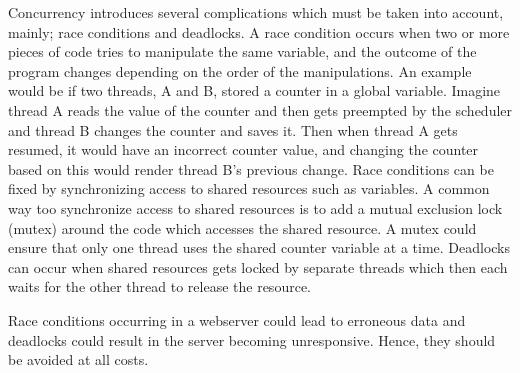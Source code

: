 Concurrency introduces several complications which must be taken into account,
mainly; race conditions and deadlocks. A race condition occurs when two or more
pieces of code tries to manipulate the same variable, and the outcome of the
program changes depending on the order of the manipulations. An example would be
if two threads, A and B, stored a counter in a global variable. Imagine thread A 
reads the value of the counter and then gets preempted by the scheduler and thread B changes
the counter and saves it. Then when thread A gets resumed, it would have an
incorrect counter value, and changing the counter based on this would render
thread B's previous change. Race conditions can be fixed by synchronizing access
to shared resources such as variables. A common way too synchronize access to
shared resources is to add a mutual exclusion lock (mutex) around the code which
accesses the shared resource. A mutex could ensure that only one thread uses the
shared counter variable at a time. Deadlocks can occur when shared resources gets
locked by separate threads which then each waits for the other thread to
release the resource.

Race conditions occurring in a webserver could lead to erroneous data and
deadlocks could result in the server becoming unresponsive. Hence, they should
be avoided at all costs.
